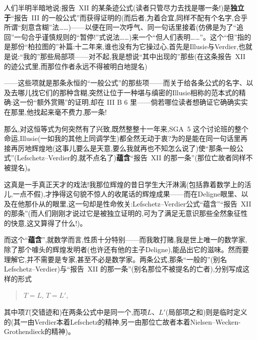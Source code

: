 \dmark{}人们半明半暗地说:报告~XII 的某条迹公式(读者只管尽力去找是哪一条!)是\textbf{独立于}“报告~III 的一般公式”而获得证明的(而后者,为着合宜,同样不配有个名字,合乎所谓“刻意含糊”法……)——以便在同一次呼气、同一句话里接着(仿佛是为了“追回”一句合乎谨慎规则的“暂停!”式说法……)来一个“但人们表明……”。这个“但”指的是那份“柏拉图的”补篇:十二年来,谁也没有为它操过心,首先是Illusie与Verdier,也就是说:“我的”那些局部项——对不起,我是想说“其中出现的”那些(在这条报告~XII 的迹公式里,而那位作者永远不得被明白地提名)

\dmark{}——这些项就是那条永恒的“一般公式”的那些项——而关于给各条公式的名字、以及去哪儿找它们的那种含糊,突然让位于一种堪与缜密的Illusie相称的范本式的精确:这一份“额外赏赐”的证明,却在 III B 6 里——倘若哪位读者想确证它确确实实在那里,他找起来毫不费力,那一条!

那么,对这恒等式为何突然有了兴致,既然整整十一年来,SGA~5 这个讨论班的整个命运,Illusie(一如我的其他上同调学生)都全然无动于衷?为的是能在同一句话里再接再厉地辉煌地(这事儿要么是天意,要么我就再也不知怎么说了)使“那条一般公式”(Lefschetz--Verdier的,就不点名了)\textbf{蕴含}“报告~XII 的那一条”(那位亡故者同样不被提名)。

这真是一手真正天才的戏法!我那位辉煌的昔日学生大汗淋漓(包括靠着数学上的活儿,一点不假),才挣得这句貌不惊人的收尾话的辉煌成果——而在Deligne眼里、以及在他那仆从的眼里,这一句却是性命攸关:Lefschetz--Verdier公式“蕴含”“报告~XII 的那条”(而人们刚刚才说过它是被独立证明的,可为了满足无意识那些全然象征性的快意,这又算得了什么!)。

而这个“\textbf{蕴含}”,就数学而言,性质十分特别——而我敢打赌,我是世上唯一的数学家,除了那个噱头的辉煌发明者(也许还有他的主子Deligne),能品出它的滋味。然而要理解它,并不需要是专家,甚至不必是数学家。两条公式,那条“一般的”(别名Lefschetz--Verdier)与“报告~XII 的那一条”(别名那位不被提名的亡者),分别写成这样的形式

\begin{quote}
$T = L$, \qquad $T = L'$,
\end{quote}

其中项$T$(交错迹和)在两条公式中是同一个,而项$L$、$L'$(局部项之和)则是临时定义的(其一由Verdier本着Lefschetz的精神,另一由那位亡故者本着Nielsen--Wecken-Grothendieck的精神)。

